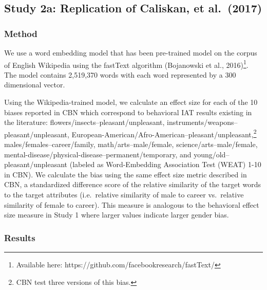 \documentclass[10pt, letterpaper]{article}
\begin{document}
\subsection{Study 2a: Replication of Caliskan, et
al.~(2017)}\label{study-2a-replication-of-caliskan-et-al.2017}

\subsubsection{Method}\label{method-1}

We use a word embedding model that has been pre-trained model on the
corpus of English Wikipedia using the fastText algorithm (Bojanowski et
al.,
2016)\footnote{Available here: https://github.com/facebookresearch/fastText/}.
The model contains 2,519,370 words with each word represented by a 300
dimensional vector.

Using the Wikipedia-trained model, we calculate an effect size for each
of the 10 biases reported in CBN which correspond to behavioral IAT
results existing in the literature:
flowers/insects--pleasant/unpleasant,
instruments/weapons--pleasant/unpleasant,
European-American/Afro-American--pleasant/unpleasant,\footnote{CBN test three versions of this bias.}
males/females--career/family, math/arts--male/female,
science/arts--male/female,
mental-disease/physical-disease--permanent/temporary, and
young/old--pleasant/unpleasant (labeled as Word-Embedding Association
Test (WEAT) 1-10 in CBN). We calculate the bias using the same effect
size metric described in CBN, a standardized difference score of the
relative similarity of the target words to the target attributes
(i.e.~relative similarity of male to career vs.~relative similarity of
female to career). This measure is analogous to the behavioral effect
size measure in Study 1 where larger values indicate larger gender bias.

\subsubsection{Results}\label{results-1}
\end{document}
